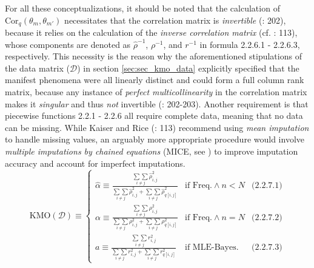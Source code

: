 \documentclass[
  10pt,
  a4paper,
  twoside]{article}
\begin{document}
For all these conceptualizations, it should be noted that the calculation of \(\text{Cor}_q(\theta_m, \theta_{m'})\) necessitates that the correlation matrix is \emph{invertible} (: 202), because it relies on the calculation of the \emph{inverse correlation matrix} (cf. : 113), whose components are denoted as \(\hat{\rho}^{-1}\), \(\rho^{-1}\), and \(r^{-1}\) in formula 2.2.6.1 - 2.2.6.3, respectively. This necessity is the reason why the aforementioned stipulations of the data matrix (\(\mathcal{D}\)) in section \ref{sec:sec_kmo_data} explicitly specified that the manifest phenomena were all linearly distinct and could form a full column rank matrix, because any instance of \emph{perfect multicollinearity} in the correlation matrix makes it \emph{singular} and thus \emph{not} invertible (: 202-203). Another requirement is that piecewise functions 2.2.1 - 2.2.6 all require complete data, meaning that no data can be missing. While Kaiser and Rice (: 113) recommend using \emph{mean imputation} to handle missing values, an arguably more appropriate procedure would involve \emph{multiple imputations by chained equations} (MICE, see ) to improve imputation accuracy and account for imperfect imputations.
\[
\text{KMO}(\mathcal{D}) \equiv
\left\{
\begin{array}{lll}
\hat{\alpha} \equiv \frac{\underset{i \neq j}{\sum \sum} \hat{\rho}^2_{i,j}}{\underset{i \neq j}{\sum \sum} \hat{\rho}^2_{i,j} + \underset{i \neq j}{\sum \sum} \hat{\rho}_{q[i,j]}^2} & \text{if Freq.} \land n < N & \text{(2.2.7.1)} \\
\alpha \equiv \frac{\underset{i \neq j}{\sum \sum} \rho^2_{i,j}}{\underset{i \neq j}{\sum \sum} \rho^2_{i,j} + \underset{i \neq j}{\sum \sum} \rho_{q[i,j]}^2} & \text{if Freq.} \land n = N & \text{(2.2.7.2)} \\
a \equiv \frac{\underset{i \neq j}{\sum \sum} r^2_{i,j}}{\underset{i \neq j}{\sum \sum} r^2_{i,j} + \underset{i \neq j}{\sum \sum} r_{q[i,j]}^2} & \text{if MLE-Bayes.} & \text{(2.2.7.3)}
\end{array}
\right.
\tag{2.2.7}
\]
\end{document}

